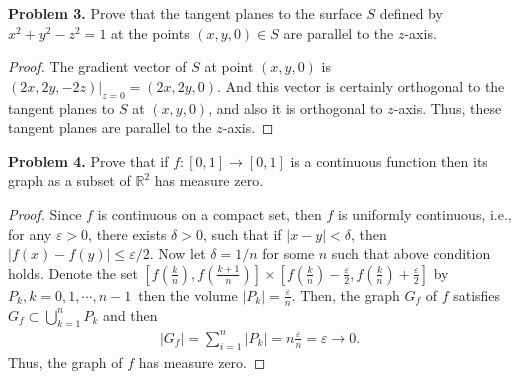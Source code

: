 \documentclass[12pt,leqno]{amsart}
\theoremstyle{definition}
\begin{document}
\medskip


\noindent
{\bf Problem 3.}
Prove that the tangent planes to the surface $S$ defined by $x^2+y^2-z^2=1$ at the points
$(x,y,0)\in S$ are parallel to the $z$-axis.
\begin{proof}
The gradient vector of $S$ at point $(x,y,0)$ is $(2x, 2y, -2z)|_{z=0} = (2x,2y,0)$. And this vector is certainly orthogonal to the tangent planes to $S$ at $(x,y,0)$, and also it is orthogonal to $z$-axis. Thus, these tangent planes are parallel to the $z$-axis.
\end{proof}


\medskip




\noindent
{\bf Problem 4.}
Prove that if $f:[0,1]\to [0,1]$ is a continuous function then its graph as
a subset of $\mathbb{R}^2$ has measure zero.
\begin{proof}
Since $f$ is continuous on a compact set, then $f$ is uniformly continuous, i.e., for any $\varepsilon > 0$, there exists $\delta > 0$, such that if $|x - y| < \delta$, then $|f(x) - f(y)| \leq \varepsilon/2$. Now let $\delta = 1/n$ for some $n$ such that above condition holds. Denote the set $\left[f\left(\frac{k}{n}\right), f\left(\frac{k+1}{n}\right)\right] \times \left[f\left(\frac{k}{n}\right) - \frac{\varepsilon}{2}, f\left(\frac{k}{n}\right) + \frac{\varepsilon}{2}\right]$ by $P_k, k = 0,1,\cdots,n-1$\, then the volume $|P_k| = \frac{\varepsilon}{n}$. Then, the graph $G_f$ of $f$ satisfies $G_f \subset \bigcup^n_{k=1} P_k$ and then 
\begin{align*}
    |G_f| = \sum^n_{i=1} |P_k| = n \frac{\varepsilon}{n} = \varepsilon \to 0.
\end{align*}
Thus, the graph of $f$ has measure zero.
\end{proof}


\medskip
\end{document}
